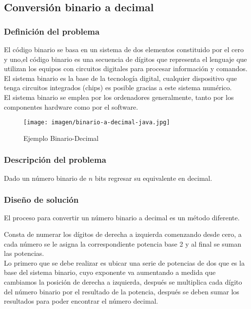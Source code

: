 \subsection{Conversión binario a decimal}


\subsubsection{Definición del problema}

El código binario se basa en un sistema de dos elementos constituido por el cero y uno,el código binario es una secuencia de dígitos que representa el lenguaje que utilizan los equipos con circuitos digitales para procesar información y comandos.  
\\
El sistema binario es la base de la tecnología digital, cualquier dispositivo que tenga circuitos integrados (chips) es posible gracias a este sistema numérico.
\\
El sistema binario se emplea por los ordenadores generalmente, tanto por los componentes hardware como por el software.\cite{SistemaBinario}\\

\begin{figure}[H]
    \centerline{\texttt{[image: imagen/binario-a-decimal-java.jpg]}}
    \caption{Ejemplo Binario-Decimal}
    \label{fig}
\end{figure}

\subsubsection{Descripción del problema}

Dado un número binario de $n$ bits regresar su equivalente en decimal.\\

\subsubsection{Diseño de solución}

El proceso para convertir un número binario a decimal es un método diferente.

Consta de numerar los dígitos de derecha a izquierda comenzando desde cero, a cada número se le asigna la correspondiente potencia base 2 y al final se suman las potencias.\\

Lo primero que se debe realizar es ubicar una serie de potencias de dos que es la base del sistema binario, cuyo exponente va aumentando a medida que cambiamos la posición de derecha a izquierda, después se multiplica cada dígito del número binario por el resultado de la potencia, después se deben sumar los resultados para poder encontrar el número decimal.\\

